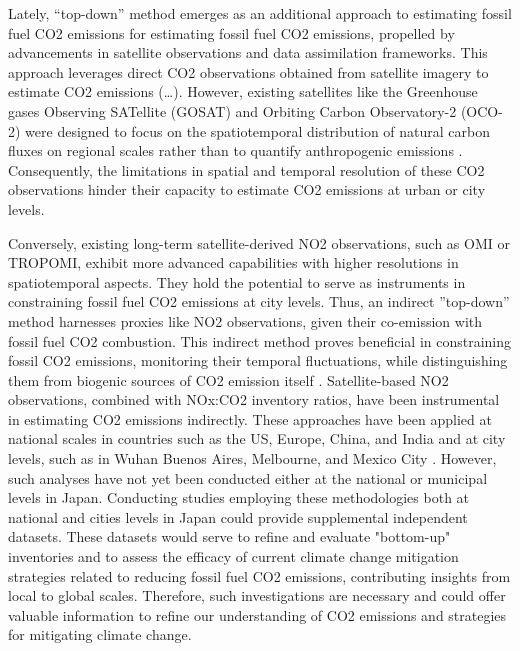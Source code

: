Lately, “top-down” method emerges as an additional approach to estimating fossil fuel CO2 emissions for estimating fossil fuel CO2 emissions, propelled by advancements in satellite observations and data assimilation frameworks. This approach leverages direct CO2 observations obtained from satellite imagery to estimate CO2 emissions (…). However, existing satellites like the Greenhouse gases Observing SATellite (GOSAT) and Orbiting Carbon Observatory-2 (OCO-2) were designed to focus on the spatiotemporal distribution of natural carbon fluxes on regional scales rather than to quantify anthropogenic emissions \citep{nassar2017quantifying, yang2023using}. Consequently, the limitations in spatial and temporal resolution of these CO2 observations hinder their capacity to estimate CO2 emissions at urban or city levels. \par

Conversely, existing long-term satellite-derived NO2 observations, such as OMI or TROPOMI, exhibit more advanced capabilities with higher resolutions in spatiotemporal aspects. They hold the potential to serve as instruments in constraining fossil fuel CO2 emissions at city levels. Thus, an indirect ”top-down” method harnesses proxies like NO2 observations, given their co-emission with fossil fuel CO2 combustion. This indirect method proves beneficial in constraining fossil CO2 emissions, monitoring their temporal fluctuations, while distinguishing them from biogenic sources of CO2 emission itself \citep{ciais2014current, goldberg2019exploiting}. Satellite-based NO2 observations, combined with NOx:CO2 inventory ratios, have been instrumental in estimating CO2 emissions indirectly. These approaches have been applied at national scales in countries such as the US, Europe, China, and India \citep{konovalov2016estimation, zheng2020satellite, miyazaki2023predictability} and at city levels, such as in Wuhan \citep{zhang2023quantifying} Buenos Aires, Melbourne, and Mexico City \citep{yang2023using}. However, such analyses have not yet been conducted either at the national or municipal levels in Japan. Conducting studies employing these methodologies both at national and cities levels in Japan could provide supplemental independent datasets. These datasets would serve to refine and evaluate "bottom-up" inventories and to assess the efficacy of current climate change mitigation strategies related to reducing fossil fuel CO2 emissions, contributing insights from local to global scales. Therefore, such investigations are necessary and could offer valuable information to refine our understanding of CO2 emissions and strategies for mitigating climate change. \par

